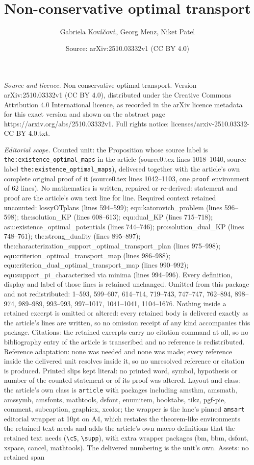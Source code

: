 \documentclass[10pt,a4paper]{amsart}
\title[Non-conservative optimal transport]{Non-conservative optimal transport}
\author{Gabriela Kov\'a\v{c}ov\'a, Georg Menz, Niket Patel}
\date{Source: arXiv:2510.03332v1 (CC BY 4.0)}
\begin{document}
\maketitle

\noindent\emph{Source and licence.} Non-conservative optimal transport. Version arXiv:2510.03332v1 (CC BY 4.0), distributed under the Creative Commons Attribution 4.0 International licence, as recorded in the arXiv licence metadata for this exact version and shown on the abstract page https://arxiv.org/abs/2510.03332v1. Full rights notice: licenses/arxiv-2510.03332-CC-BY-4.0.txt.\par\smallskip

\noindent\textit{Editorial scope.} Counted unit: the Proposition whose source label is \texttt{the:existence\_optimal\_maps} in the article (source0.tex lines 1018--1040, source label \texttt{the:existence\_optimal\_maps}), delivered together with the article's own complete original proof of it (source0.tex lines 1042--1103, one \texttt{proof} environment of 62 lines). No mathematics is written, repaired or re-derived: statement and proof are the article's own text line for line. Required context retained uncounted: lossyOTplans (lines 594--599); equ:katorovich\_problem (lines 596--598); the:solution\_KP (lines 608--613); equ:dual\_KP (lines 715--718); asu:existence\_optimal\_potentials (lines 744--746); pro:solution\_dual\_KP (lines 748--761); the:strong\_duality (lines 895--897); the:characterization\_support\_optimal\_transport\_plan (lines 975--998); equ:criterion\_optimal\_transport\_map (lines 986--988); equ:criterion\_dual\_optimal\_transport\_map (lines 990--992); equ:support\_pi\_characterized via minima (lines 994--996). Every definition, display and label of those lines is retained unchanged. Omitted from this package and not redistributed: 1--593, 599--607, 614--714, 719--743, 747--747, 762--894, 898--974, 989--989, 993--993, 997--1017, 1041--1041, 1104--1676. Nothing inside a retained excerpt is omitted or altered: every retained body is delivered exactly as the article's lines are written, so no omission receipt of any kind accompanies this package. Citations: the retained excerpts carry no citation command at all, so no bibliography entry of the article is transcribed and no reference is redistributed. Reference adaptation: none was needed and none was made; every reference inside the delivered unit resolves inside it, so no unresolved reference or citation is produced. Printed slips kept literal: no printed word, symbol, hypothesis or number of the counted statement or of its proof was altered. Layout and class: the article's own class is \texttt{article} with packages including amsthm, amsmath, amssymb, amsfonts, mathtools, dsfont, enumitem, booktabs, tikz, pgf-pie, comment, subcaption, graphicx, xcolor; the wrapper is the lane's pinned \texttt{amsart} editorial wrapper at 10pt on A4, which restates the theorem-like environments the retained text needs and adds the article's own macro definitions that the retained text needs (\texttt{\textbackslash cS}, \texttt{\textbackslash supp}), with extra wrapper packages (bm, bbm, dsfont, xspace, cancel, mathtools). The delivered numbering is the unit's own. Assets: no retained span 
\end{document}
